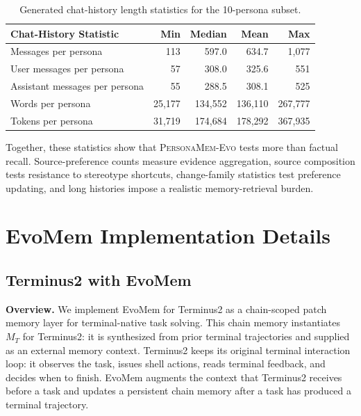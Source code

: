 \documentclass{article}
\begin{document}
\begin{table}[!htbp]
\centering
\small
\begin{tabular}{lrrrr}
\toprule
\textbf{Chat-History Statistic} & \textbf{Min} & \textbf{Median} & \textbf{Mean} & \textbf{Max} \\
\midrule
Messages per persona & 113 & 597.0 & 634.7 & 1,077 \\
User messages per persona & 57 & 308.0 & 325.6 & 551 \\
Assistant messages per persona & 55 & 288.5 & 308.1 & 525 \\
Words per persona & 25,177 & 134,552 & 136,110 & 267,777 \\
Tokens per persona & 31,719 & 174,684 & 178,292 & 367,935 \\
\bottomrule
\end{tabular}
\caption{Generated chat-history length statistics for the 10-persona subset.}
\label{tab:personamem_evo_context_length}
\end{table}

Together, these statistics show that \textsc{PersonaMem-Evo} tests more than factual recall. Source-preference counts measure evidence aggregation, source composition tests resistance to stereotype shortcuts, change-family statistics test preference updating, and long histories impose a realistic memory-retrieval burden.





\section{EvoMem Implementation Details}
\label{appendix:evomem_implement}


\subsection{Terminus2 with EvoMem}
\label{sec:evomem_terminus2}

\textbf{Overview.}
We implement EvoMem for Terminus2 as a chain-scoped patch memory layer for terminal-native task solving. This chain memory instantiates $M_T$ for Terminus2: it is synthesized from prior terminal trajectories and supplied as an external memory context. Terminus2 keeps its original terminal interaction loop: it observes the task, issues shell actions, reads terminal feedback, and decides when to finish. EvoMem augments the context that Terminus2 receives before a task and updates a persistent chain memory after a task has produced a terminal trajectory.
\end{document}
